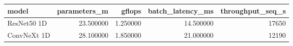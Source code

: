 \begin{tabular}{lrrrr}
\toprule
model & parameters_m & gflops & batch_latency_ms & throughput_seq_s \\
\midrule
ResNet50 1D & 23.500000 & 1.250000 & 14.500000 & 17650 \\
ConvNeXt 1D & 28.100000 & 1.850000 & 21.000000 & 12190 \\
\bottomrule
\end{tabular}
